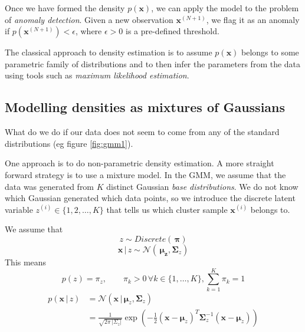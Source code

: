 \documentclass[final,3p,times,twocolumn]{elsarticle}
\begin{document}
Once we have formed the density $p(\boldsymbol x)$, we can apply the model to the problem of \emph{anomaly detection}.
Given a new observation $\boldsymbol x^{(N+1)}$, we flag it as an anomaly if $p(\boldsymbol x^{(N+1)}) < \epsilon$, where $\epsilon > 0$ is a pre-defined threshold.

The classical approach to density estimation is to assume $p(\boldsymbol x)$ belongs to some parametric family of distributions and to then infer the parameters from the data using tools such as \emph{maximum likelihood estimation}. 

\subsection{Modelling densities as mixtures of Gaussians}

What do we do if our data does not seem to come from any of the standard distributions (eg figure \ref{fig:gmm1}).

One approach is to do non-parametric density estimation. A more straight forward strategy is to use a mixture model.
In the GMM, we assume that the data was generated from $K$ distinct Gaussian \emph{base distributions}. 
We do not know which Gaussian generated which data points, so we introduce the discrete latent variable $z^{(i)} \in \{1,2,\dots,K\}$ that tells us which cluster sample $\boldsymbol x^{(i)}$ belongs to.

We assume that 
\begin{equation}
z \sim Discrete(\,\boldsymbol \pi)
\label{eqnzdistro}
\end{equation}
\begin{equation}
\boldsymbol x \,|\, z \sim \mathcal{N}(\,\boldsymbol{\mu_z}, \boldsymbol \Sigma_z)
\label{eqn:x|z-distro}
\end{equation}
This means
\begin{equation}
p(z) = \pi_z, \qquad \pi_k > 0 \, \forall k \in \{1,\dots,K\}, \sum_{k=1}^K \pi_k = 1 
\end{equation}
\begin{equation}
\begin{split}
p(\boldsymbol x\,|\,z) &= \mathcal{N}(\boldsymbol x\,|\, \boldsymbol \mu_z, \boldsymbol \Sigma_z) \\
&= \frac{1}{\sqrt{2\pi\,|\Sigma_z|}}\exp(-\frac{1}{2}(\boldsymbol x - \boldsymbol \mu_z)^T\boldsymbol \Sigma_z^{-1} (\boldsymbol x - \boldsymbol \mu_z))\\
\end{split}
\end{equation}
\end{document}
